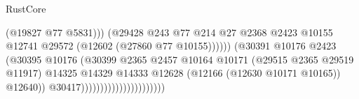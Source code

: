 \begin{lexlean}{RustCore}
\begin{coremodule}
                                                                            (@19827 @77 @5831)))
                                                                        (@29428
                                                                          @243
                                                                          @77
                                                                          @214
                                                                          @27
                                                                          @2368
                                                                          @2423
                                                                          @10155
                                                                          @12741
                                                                          @29572
                                                                          (@12602
                                                                            (@27860 @77 @10155))))))
                                                                  (@30391
                                                                    @10176
                                                                    @2423
                                                                    (@30395
                                                                      @10176
                                                                      (@30399
                                                                        @2365
                                                                        @2457
                                                                        @10164
                                                                        @10171
                                                                        (@29515 @2365 @29519 @11917)
                                                                        @14325
                                                                        @14329
                                                                        @14333
                                                                        @12628
                                                                        (@12166
                                                                          (@12630 @10171 @10165))
                                                                        @12640))
                                                                    @30417))))))))))))))))))))))

\end{coremodule}
\end{lexlean}
